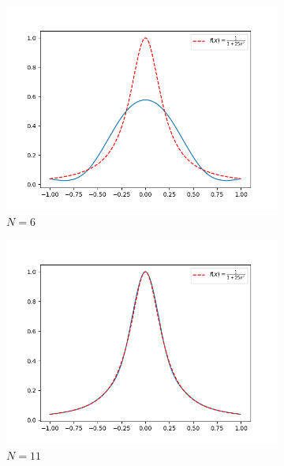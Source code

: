 \documentclass[a4paper]{article}
\begin{document}
\begin{figure}[H]
    \centering
    \begin{subfigure}[b]{0.4\textwidth}
        \centering
        \includegraphics[width=\textwidth]{../figure/A_6.png}
        \caption{$N=6$}
    \end{subfigure}
    \begin{subfigure}[b]{0.4\textwidth}
        \centering
        \includegraphics[width=\textwidth]{../figure/A_11.png}
        \caption{$N=11$}
    \end{subfigure}
    \\
    \begin{subfigure}[b]{0.4\textwidth}
        \centering

\end{subfigure}
\end{figure}
\end{document}
